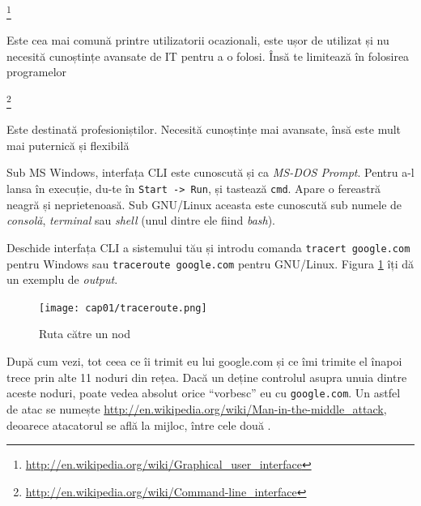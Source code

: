 \begin{itemize}
	\begin{item} \footnote{\url{http://en.wikipedia.org/wiki/Graphical_user_interface}}
	\end{item}
	
	\begin{item}
    \footnote{\url{http://en.wikipedia.org/wiki/Command-line_interface}}
	\end{item}
\end{itemize}
Sub MS Windows, interfața CLI este cunoscută și ca \textsl{MS-DOS Prompt}. Pentru
a-l lansa în execuție, du-te în \texttt{Start -> Run}, și tastează \texttt{cmd}.
Apare o fereastră neagră și neprietenoasă. Sub GNU/Linux aceasta este
cunoscută sub numele de \textsl{consolă}, \textsl{terminal} sau
\textsl{shell} (unul dintre ele fiind \textsl{bash}).

Deschide interfața CLI a sistemului tău și introdu comanda
\texttt{tracert google.com} pentru Windows sau \texttt{traceroute google.com} pentru 
GNU/Linux. Figura \ref{fig:cli traceroute} îți dă un exemplu de \textsl{output}.

\begin{figure}[ht!]
  \centering
    \texttt{[image: cap01/traceroute.png]}
  \caption{Ruta către un nod}
  \label{fig:cli traceroute}
\end{figure}

După cum vezi, tot ceea ce îi trimit eu lui google.com și ce îmi trimite
el înapoi trece prin alte 11 noduri din rețea. Dacă un 
deține controlul asupra unuia dintre aceste noduri,
poate vedea absolut orice ``vorbesc'' eu cu \texttt{google.com}. Un astfel de atac
se numește \url{http://en.wikipedia.org/wiki/Man-in-the-middle_attack},
deoarece atacatorul se află la mijloc, între
cele două .

